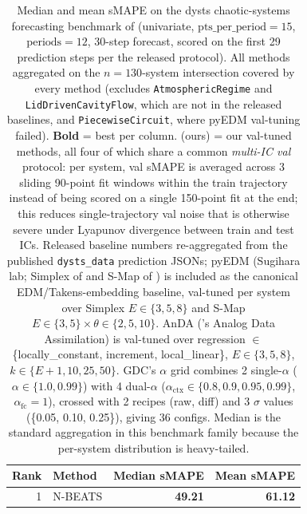 \begin{table}[t]
\centering
\caption{Median and mean sMAPE on the dysts chaotic-systems forecasting benchmark of \citet{gilpin2021chaos} (univariate, $\mathrm{pts\_per\_period}=15$, $\mathrm{periods}=12$, 30-step forecast, scored on the first 29 prediction steps per the released protocol). All methods aggregated on the $n=130$-system intersection covered by every method (excludes \texttt{AtmosphericRegime} and \texttt{LidDrivenCavityFlow}, which are not in the released baselines, and \texttt{PiecewiseCircuit}, where pyEDM val-tuning failed). \textbf{Bold} = best per column. (ours) = our val-tuned methods, all four of which share a common \emph{multi-IC val} protocol: per system, val sMAPE is averaged across 3 sliding 90-point fit windows within the train trajectory instead of being scored on a single 150-point fit at the end; this reduces single-trajectory val noise that is otherwise severe under Lyapunov divergence between train and test ICs. Released baseline numbers re-aggregated from the published \texttt{dysts\_data} prediction JSONs; pyEDM (Sugihara lab; Simplex of \citet{sugihara1990simplex} and S-Map of \citet{sugihara1994smap}) is included as the canonical EDM/Takens-embedding baseline, val-tuned per system over Simplex $E\in\{3,5,8\}$ and S-Map $E\in\{3,5\}\times\theta\in\{2,5,10\}$. AnDA (\citet{lguensat2017anda}'s Analog Data Assimilation) is val-tuned over regression $\in$ \{locally\_constant, increment, local\_linear\}, $E\in\{3,5,8\}$, $k\in\{E{+}1,10,25,50\}$. GDC's $\alpha$ grid combines 2 single-$\alpha$ ($\alpha\in\{1.0, 0.99\}$) with 4 dual-$\alpha$ ($\alpha_\text{ctx}\in\{0.8, 0.9, 0.95, 0.99\}$, $\alpha_\text{fc}=1$), crossed with 2 recipes (raw, diff) and 3 $\sigma$ values (\{0.05, 0.10, 0.25\}), giving 36 configs. Median is the standard aggregation in this benchmark family because the per-system distribution is heavy-tailed.}
\label{tab:dysts_leaderboard}
\small
\begin{tabular}{r l r r}
\toprule
Rank & Method & Median sMAPE & Mean sMAPE \\
\midrule
 1 & N-BEATS                                 & \textbf{49.21} & \textbf{61.12} \\

\end{tabular}
\end{table}
